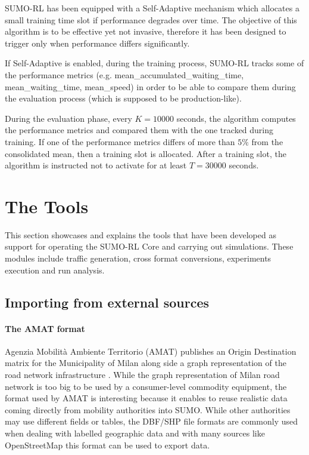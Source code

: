 SUMO-RL has been equipped with a Self-Adaptive mechanism which allocates a small training time slot if performance degrades over time.
The objective of this algorithm is to be effective yet not invasive, therefore it has been designed to trigger only when performance differs significantly.

If Self-Adaptive is enabled, during the training process, SUMO-RL tracks some of the performance metrics (e.g. mean\_accumulated\_waiting\_time, mean\_waiting\_time, mean\_speed) in order to be able to compare them during the evaluation process (which is supposed to be production-like).

During the evaluation phase, every $K = 10000$ seconds, the algorithm computes the performance metrics and compared them with the one tracked during training.
If one of the performance metrics differs of more than $5\%$ from the consolidated mean, then a training slot is allocated.
After a training slot, the algorithm is instructed not to activate for at least $T = 30000$ seconds.

\section{The Tools}

This section showcases and explains the tools that have been developed as support for operating the SUMO-RL Core and carrying out simulations.
These modules include traffic generation, cross format conversions, experiments execution and run analysis.

\subsection{Importing from external sources}

\paragraph{The AMAT format}

Agenzia Mobilit\`a Ambiente Territorio (AMAT) publishes an Origin Destination matrix for the Municipality of Milan along side a graph representation of the road network infrastructure \cite{ODMilano2010}.
While the graph representation of Milan road network is too big to be used by a consumer-level commodity equipment, the format used by AMAT is interesting because it enables to reuse realistic data coming directly from mobility authorities into SUMO.
While other authorities may use different fields or tables, the DBF/SHP file formats are commonly used when dealing with labelled geographic data and with many sources like OpenStreetMap this format can be used to export data.

